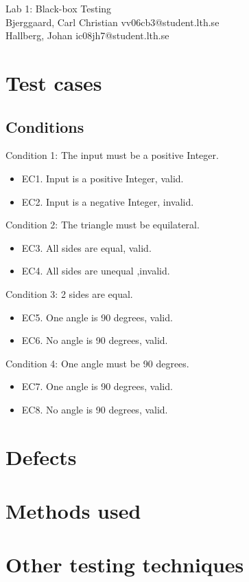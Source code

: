 \documentclass[titlepage]{article}
\begin{document}
\begin{center}
	\huge{Lab 1: Black-box Testing } \\
	\small{Bjerggaard, Carl Christian vv06cb3@student.lth.se \\Hallberg, Johan ic08jh7@student.lth.se}

\vspace*{1cm}

\end{center}

\thispagestyle{empty}

\clearpage
\section{Test cases}
\subsection{Conditions}
Condition 1: The input must be a positive Integer.
\begin{itemize}
	\item EC1. Input is a positive Integer, valid.
	\item EC2. Input is a negative Integer, invalid.
\end{itemize}

Condition 2: The triangle must be equilateral.
\begin{itemize}
	\item EC3. All sides are equal, valid. 
	\item EC4. All sides are unequal ,invalid. 
\end{itemize}

Condition 3: 2 sides are equal.  
\begin{itemize}
	\item EC5. One angle is 90 degrees, valid. 
	\item EC6. No angle is 90 degrees, valid. 
\end{itemize}


Condition 4: One angle must be 90 degrees. 
\begin{itemize}
	\item EC7. One angle is 90 degrees, valid. 
	\item EC8. No angle is 90 degrees, valid. 
\end{itemize}



  
\section{Defects}


\section{Methods used}


\section{Other testing techniques}
\end{document}
